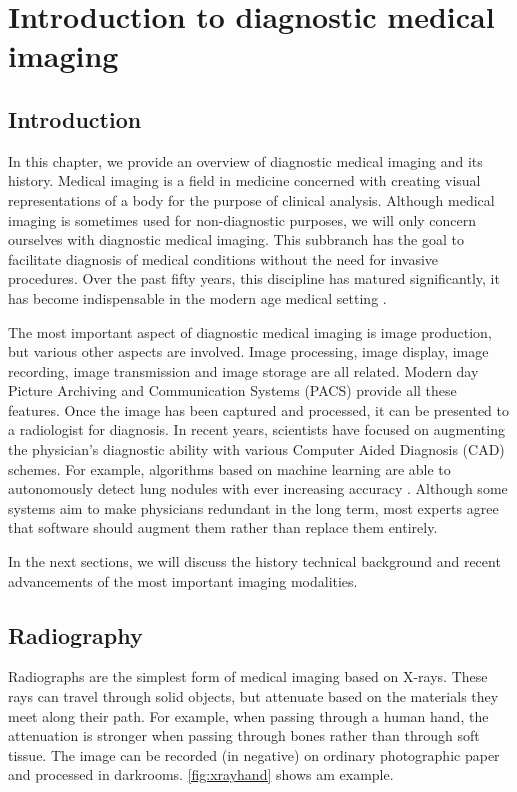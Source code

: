 \chapter{Introduction to diagnostic medical imaging}\label{chap:imaging}

\section{Introduction}
In this chapter, we provide an overview of diagnostic medical imaging and its
history. Medical imaging is a field in medicine concerned with creating visual
representations of a body for the purpose of clinical analysis. Although medical
imaging is sometimes used for non-diagnostic purposes, we will only concern
ourselves with diagnostic medical imaging. This subbranch has the goal to
facilitate diagnosis of medical conditions without the need for invasive
procedures. Over the past fifty years, this discipline has matured
significantly, it has become indispensable in the modern age medical setting
\cite{review}.

The most important aspect of diagnostic medical imaging is image production, but
various other aspects are involved. Image processing, image display, image
recording, image transmission and image storage are all related. Modern day
Picture Archiving and Communication Systems (PACS) provide all these features.
Once the image has been captured and processed, it can be presented to a
radiologist for diagnosis. In recent years, scientists have focused on
augmenting the physician's diagnostic ability with various Computer Aided
Diagnosis (CAD) schemes. For example, algorithms based on machine learning are
able to autonomously detect lung nodules with ever increasing accuracy
\cite{ginneken}. Although some systems aim to make physicians redundant in the
long term, most experts agree that software should augment them rather than
replace them entirely.

In the next sections, we will discuss the history technical background and
recent advancements of the most important imaging modalities.

\section{Radiography}
Radiographs are the simplest form of medical imaging based on X-rays. These rays
can travel through solid objects, but attenuate based on the materials they meet
along their path. For example, when passing through a human hand, the
attenuation is stronger when passing through bones rather than through soft
tissue. The image can be recorded (in negative) on ordinary photographic paper
and processed in darkrooms. \autoref{fig:xrayhand} shows am example.

